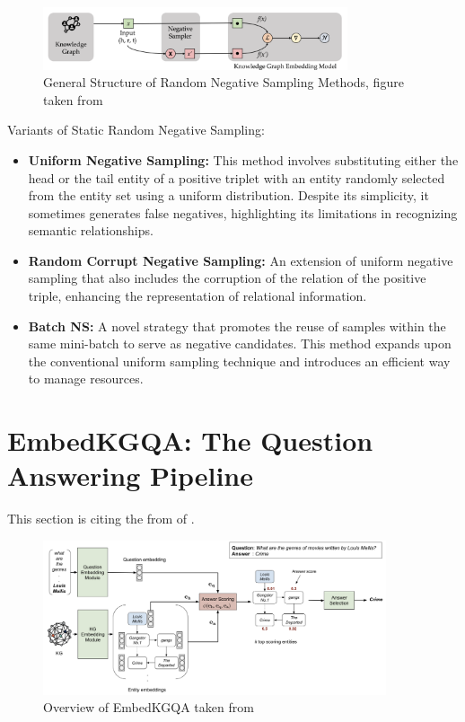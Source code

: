 \documentclass{article}
\begin{document}
\begin{figure}[!ht] %
  \centering %
  \includegraphics[width=0.8\textwidth]{NS.png} %
  \caption{General Structure of Random Negative Sampling Methods, figure taken from \textcite{madushanka2024negative}} %
  \label{fig:NS} %
\end{figure}

Variants of Static Random Negative Sampling: 
\begin{itemize}
    \item \textbf{Uniform Negative Sampling:} This method involves substituting either the head or the tail entity of a positive triplet with an entity randomly selected from the entity set using a uniform distribution. Despite its simplicity, it sometimes generates false negatives, highlighting its limitations in recognizing semantic relationships.
    \item \textbf{Random Corrupt Negative Sampling:} An extension of uniform negative sampling that also includes the corruption of the relation of the positive triple, enhancing the representation of relational information.
    \item \textbf{Batch NS:} A novel strategy that promotes the reuse of samples within the same mini-batch to serve as negative candidates. This method expands upon the conventional uniform sampling technique and introduces an efficient way to manage resources.
\end{itemize}


\section{EmbedKGQA: The Question Answering Pipeline}

This section is citing the from of \textcite{saxena-etal-2020-improving}.

\begin{figure}[!ht] %
  \centering %
  \includegraphics[width=0.9\textwidth]{EmbedKGQA.png} %
  \caption{Overview of EmbedKGQA taken from \textcite{saxena-etal-2020-improving}} %
  \label{fig:EmbedKGQA} %
\end{figure}
\end{document}
